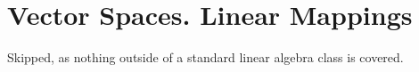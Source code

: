 \section{Vector Spaces. Linear Mappings}

Skipped, as nothing outside of a standard linear algebra class is covered.
